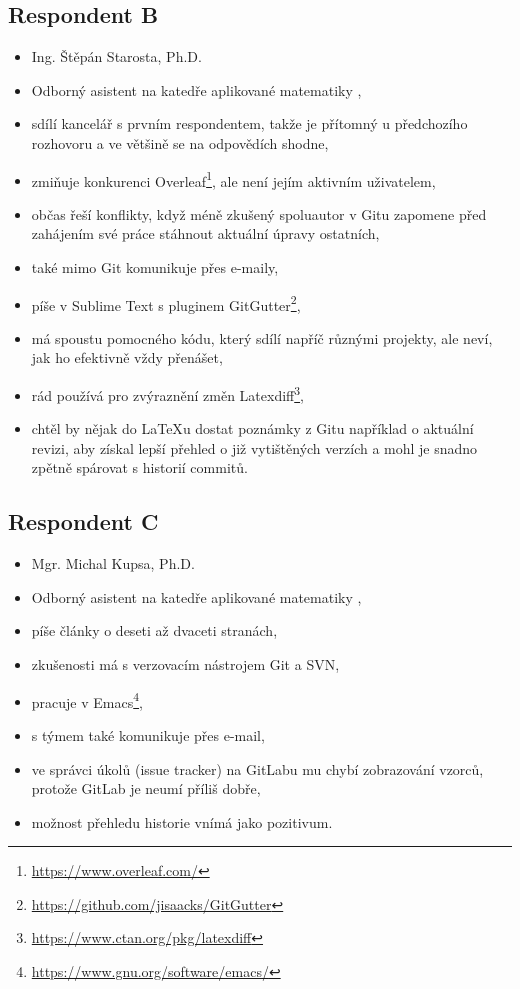 \subsection{Respondent B}

\begin{itemize}
	\item Ing. Štěpán Starosta, Ph.D.
	\item Odborný asistent na katedře aplikované matematiky \cite{kam},
	\item sdílí kancelář s prvním respondentem, takže je přítomný u předchozího rozhovoru a ve většině se na odpovědích shodne,
	\item zmiňuje konkurenci Overleaf\footnote{\url{https://www.overleaf.com/}}, ale není jejím aktivním uživatelem,
	\item občas řeší konflikty, když méně zkušený spoluautor v Gitu zapomene před zahájením své práce stáhnout aktuální úpravy ostatních,
	\item také mimo Git komunikuje přes e-maily,
	\item píše v Sublime Text s pluginem GitGutter\footnote{\url{https://github.com/jisaacks/GitGutter}},
	\item má spoustu pomocného kódu, který sdílí napříč různými projekty, ale neví, jak ho efektivně vždy přenášet,
	\item rád používá pro zvýraznění změn Latexdiff\footnote{\url{https://www.ctan.org/pkg/latexdiff}},
	\item chtěl by nějak do \LaTeX{u} dostat poznámky z Gitu například o aktuální revizi, aby získal lepší přehled o již vytištěných verzích a mohl je snadno zpětně spárovat s historií commitů.
\end{itemize}


\subsection{Respondent C}

\begin{itemize}
	\item Mgr. Michal Kupsa, Ph.D.
	\item Odborný asistent na katedře aplikované matematiky \cite{kam},
	\item píše články o deseti až dvaceti stranách,
	\item zkušenosti má s verzovacím nástrojem Git a SVN,
	\item pracuje v Emacs\footnote{\url{https://www.gnu.org/software/emacs/}},
	\item s týmem také komunikuje přes e-mail,
	\item ve správci úkolů (issue tracker) na GitLabu mu chybí zobrazování vzorců, protože GitLab je neumí příliš dobře,
	\item možnost přehledu historie vnímá jako pozitivum.
\end{itemize}


